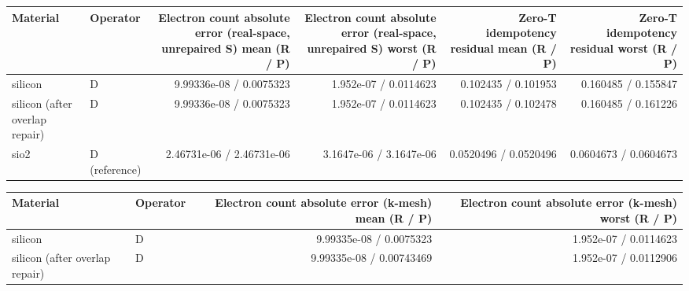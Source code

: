 \begin{tabular}{llrrrr}
\toprule
Material & Operator & Electron count absolute error (real-space, unrepaired S) mean (R / P) & Electron count absolute error (real-space, unrepaired S) worst (R / P) & Zero-T idempotency residual mean (R / P) & Zero-T idempotency residual worst (R / P) \\
\midrule
silicon & D & 9.99336e-08 / 0.0075323 & 1.952e-07 / 0.0114623 & 0.102435 / 0.101953 & 0.160485 / 0.155847 \\
silicon (after overlap repair) & D & 9.99336e-08 / 0.0075323 & 1.952e-07 / 0.0114623 & 0.102435 / 0.102478 & 0.160485 / 0.161226 \\
sio2 & D (reference) & 2.46731e-06 / 2.46731e-06 & 3.1647e-06 / 3.1647e-06 & 0.0520496 / 0.0520496 & 0.0604673 / 0.0604673 \\
\bottomrule
\end{tabular}
\begin{tabular}{llrr}
\toprule
Material & Operator & Electron count absolute error (k-mesh) mean (R / P) & Electron count absolute error (k-mesh) worst (R / P) \\
\midrule
silicon & D & 9.99335e-08 / 0.0075323 & 1.952e-07 / 0.0114623 \\
silicon (after overlap repair) & D & 9.99335e-08 / 0.00743469 & 1.952e-07 / 0.0112906 \\
\bottomrule
\end{tabular}
